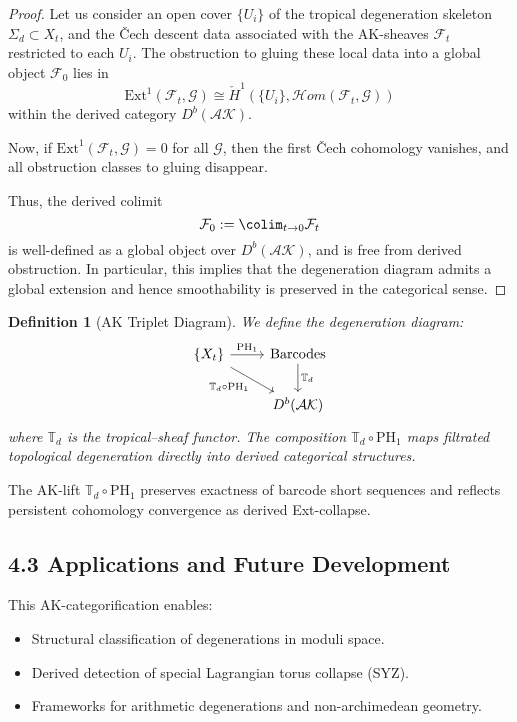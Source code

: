 \documentclass[11pt]{article}
\newtheorem{definition}[theorem]{Definition}
\begin{document}
\begin{proof}
Let us consider an open cover \( \{U_i\} \) of the tropical degeneration skeleton \( \Sigma_d \subset X_t \),  
and the Čech descent data associated with the AK-sheaves \( \mathcal{F}_t \) restricted to each \( U_i \).  
The obstruction to gluing these local data into a global object \( \mathcal{F}_0 \) lies in  
\[
\mathrm{Ext}^1(\mathcal{F}_t, \mathcal{G}) \cong \check{H}^1(\{U_i\}, \mathcal{H}om(\mathcal{F}_t, \mathcal{G}))
\]
within the derived category \( D^b(\mathcal{AK}) \).

Now, if \( \mathrm{Ext}^1(\mathcal{F}_t, \mathcal{G}) = 0 \) for all \( \mathcal{G} \),  
then the first Čech cohomology vanishes, and all obstruction classes to gluing disappear.

Thus, the derived colimit
\[
\mathcal{F}_0 := \colim_{t \to 0} \mathcal{F}_t
\]
is well-defined as a global object over \( D^b(\mathcal{AK}) \), and is free from derived obstruction.  
In particular, this implies that the degeneration diagram admits a global extension and hence smoothability is preserved in the categorical sense.
\end{proof}

\begin{definition}[AK Triplet Diagram]
We define the degeneration diagram:
\[
\begin{tikzcd}
\{X_t\} \arrow[r, "\mathrm{PH}_1"] \arrow[dr, swap, "\mathbb{T}_d \circ \mathrm{PH}_1"] & \text{Barcodes} \arrow[d, "\mathbb{T}_d"] \\
& D^b(\mathcal{AK})
\end{tikzcd}
\]
where $\mathbb{T}_d$ is the tropical--sheaf functor. The composition $\mathbb{T}_d \circ \mathrm{PH}_1$ maps filtrated topological degeneration directly into derived categorical structures.
\end{definition}

\begin{lemma}
The AK-lift $\mathbb{T}_d \circ \mathrm{PH}_1$ preserves exactness of barcode short sequences and reflects persistent cohomology convergence as derived Ext-collapse.
\end{lemma}

\subsection{4.3 Applications and Future Development}

This AK-categorification enables:
\begin{itemize}
    \item Structural classification of degenerations in moduli space.
    \item Derived detection of special Lagrangian torus collapse (SYZ).
    \item Frameworks for arithmetic degenerations and non-archimedean geometry.
\end{itemize}
\end{document}
